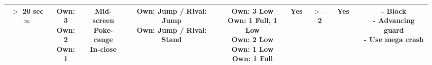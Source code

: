 \documentclass{article}
\begin{document}
\begin{landscape}
\begin{table}[h!]
\begin{center}
\begin{tabular*}{27cm}{c|c|c|c|c|c|c|c|c|c}
      \hline
      \makecell{$>$ 20 sec \\ $\infty$} & \makecell{Own: 3 \\ Own: 2 \\ Own: 1} & \makecell{Mid-screen \\ Poke-range \\ In-close} & \makecell{Own: Jump / Rival: Jump \\ Own: Jump / Rival: Stand} & \makecell{Own: 3 Low \\ Own: 1 Full, 1 Low \\ Own: 2 Low \\ Own: 1 Low \\ Own: 1 Full} & Yes & $>$= 2 & Yes & & \makecell{- Block \\ - Advancing guard \\ - Use mega crash}\\
      \hline
    \end{tabular*}
  \end{center}
\end{table}

\end{landscape}

\newpage 
\end{document}
